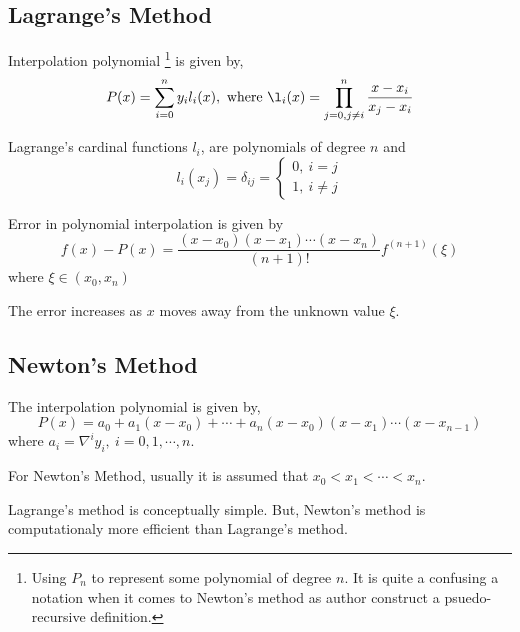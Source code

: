 \subsection{Lagrange's Method}
Interpolation polynomial
\footnote{
	Using $P_n$ to represent some polynomial of degree $n$.
	It is quite a confusing a notation when it comes to Newton's method as author construct a psuedo-recursive definition.
	}
	is given by,
\begin{equation}
	P(x) = \sum_{i=0}^n y_i l_i(x),\text{ where } \l_i(x) = \prod_{j = 0,j \ne i}^n \frac{x-x_i}{x_j-x_i}
	\label{equ:lagrange}
\end{equation}
\begin{remark}
	Lagrange's cardinal functions $l_i$, are polynomials of degree $n$ and
	\[l_i(x_j) = \delta_{ij} = \begin{cases} 0,\ i = j \\ 1,\ i \ne j \end{cases}\]
\end{remark}
\begin{proposition}
	Error in polynomial interpolation is given by
	\begin{equation}
		f(x) - P(x) = \frac{(x-x_0)(x-x_1)\cdots(x-x_n)}{(n+1)!} f^{(n+1)}(\xi)
		\label{equ:error}
	\end{equation}
	where $\xi \in (x_0, x_n)$
\end{proposition}
\begin{remark}
	The error increases as $x$ moves away from the unknown value $\xi$.
\end{remark}

\subsection{Newton's Method}
The interpolation polynomial is given by,
\begin{equation}
	P(x) = a_0 + a_1(x-x_0) + \cdots + a_n(x-x_0)(x-x_1)\cdots(x-x_{n-1})
	\label{equ:newton}
\end{equation}
where $a_i = \nabla^i y_i,\ i = 0,1,\cdots,n$.
\begin{remark}
	For Newton's Method, usually it is assumed that $x_0 < x_1 < \cdots < x_n$.
\end{remark}
\begin{remark}
	 Lagrange's method is conceptually simple.
	 But, Newton's method is computationaly more efficient than Lagrange's method.
\end{remark}
